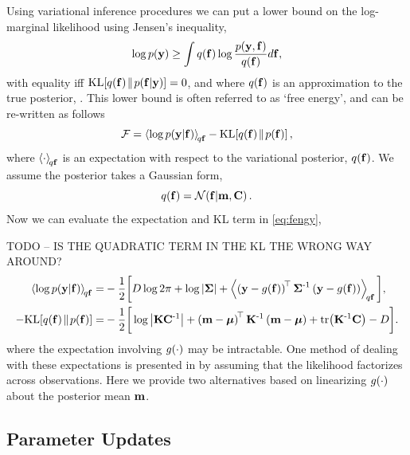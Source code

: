 \documentclass{article} %
\begin{document}
Using variational inference procedures we can put a lower bound on the
log-marginal likelihood using Jensen's inequality, 
\begin{equation}
    \log p\!\left({\mathbf{y}}\right) \geq \int q\!\left({\mathbf{f}}\right) \log 
        \frac{p\!\left({\mathbf{y}, \mathbf{f}}\right)}{q\!\left({\mathbf{f}}\right)} d\mathbf{f},
\end{equation}
with equality iff $\text{KL}\!\left[{{q\!\left({\mathbf{f}}\right)}\!\parallel\!{p\!\left({\mathbf{f}}\middle\vert{\ensuremath{\mathbf{y}}}\right)}}\right] = 0$, and where
$q\!\left({\mathbf{f}}\right)$ is an approximation to the true posterior,
\probC{\lstate}{\obs}. This lower bound is often referred to as `free energy',
and can be re-written as follows
\begin{equation}
    \mathcal{F} = \left\langle{\log \ensuremath{p\!\left({\mathbf{y}}\middle\vert{\ensuremath{\mathbf{f}}}\right)}}\right\rangle_{\!{q\mathbf{f}}}
        - \text{KL}\!\left[{{q\!\left({\mathbf{f}}\right)}\!\parallel\!{p\!\left({\mathbf{f}}\right)}}\right],
    \label{eq:fengy}
\end{equation}
where $\left\langle{\cdot}\right\rangle_{\!{q\mathbf{f}}}$ is an expectation with respect to the
variational posterior, $q\!\left({\mathbf{f}}\right)$. We assume the posterior takes a
Gaussian form,
\begin{equation}
    q\!\left({\mathbf{f}}\right) = \mathcal{N}\!\left({\mathbf{f}}\middle\vert{\ensuremath{\mathbf{m}}, \ensuremath{\mathbf{C}}}\right). \label{eq:varpost}
\end{equation}
Now we can evaluate the expectation and KL term in \eqref{eq:fengy},

TODO -- IS THE QUADRATIC TERM IN THE KL THE WRONG WAY AROUND?
\begin{align}
    \expec{q\lstate}{\log \probC{\obs}{\lstate}}
        =& - \frac{1}{2} \bigg[ 
            D\log{2\pi} + \log\deter{\lcov} 
            + \expec{q\lstate}{\brac{\obs - \nonlin{\lstate}}\transpose\lcov\inv
            \brac{\obs - \nonlin{\lstate}}}\bigg],
            \label{eq:qlike} \\
     - \KL{\qrob{\lstate}}{\prob{\lstate}}
        =& - \frac{1}{2} \bigg[\log\deter{\prcov\pocov\inv}
            + \brac{\pomean - \prmean}\transpose\prcov\inv
            \brac{\pomean - \prmean}
            + \trace{\prcov\inv\pocov} - D\bigg] \label{eq:qkl}.
\end{align}
where the expectation involving $g\!\left({{\cdot}}\right)$ may be intractable. One method
of dealing with these expectations is presented in \cite{Opper2009} by assuming
that the likelihood factorizes across observations. Here we provide two
alternatives based on linearizing $g\!\left({{\cdot}}\right)$ about  the posterior mean
$\mathbf{m}$.


\subsection{Parameter Updates}
\end{document}
